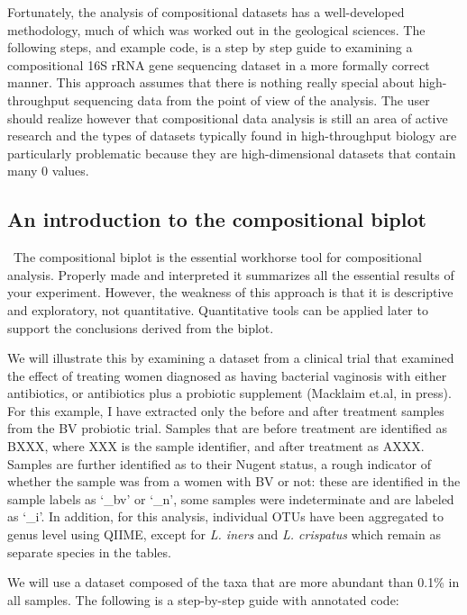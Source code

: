 \documentclass[11pt]{article}\usepackage[]{graphicx}\usepackage[]{color}
\begin{document}
Fortunately, the analysis of compositional datasets has a well-developed methodology, much of which was worked out in the geological sciences. The following steps, and example code, is a step by step guide to examining a compositional 16S rRNA gene sequencing dataset in a more formally correct manner. This approach assumes that there is nothing really special about high-throughput sequencing data from the point of view of the analysis. The user should realize however that compositional data analysis is still an area of active research and the types of datasets typically found in high-throughput biology are particularly problematic because they are  high-dimensional datasets that contain many 0 values.

\subsection{An introduction to the compositional biplot}\  The compositional biplot is the essential workhorse tool for compositional analysis. Properly made and interpreted it summarizes all the essential results of your experiment. However, the weakness of this approach is that it is descriptive and exploratory, not quantitative. Quantitative tools can be applied later to support the conclusions derived from the biplot. 

We will illustrate this by examining a dataset from a clinical trial that examined the effect of treating women diagnosed as having bacterial vaginosis with either antibiotics, or antibiotics plus a probiotic supplement (Macklaim et.al, in press). For this example, I have extracted only the before and after treatment samples from the BV probiotic trial. Samples that are before treatment are identified as BXXX, where XXX is the sample identifier, and after treatment as AXXX. Samples are further identified as to their Nugent status, a rough indicator of whether the sample was from a women with BV or not: these are identified in the sample labels as `\_bv' or `\_n', some samples were indeterminate and are labeled as `\_i'. In addition, for this analysis,  individual OTUs have been aggregated to genus level using QIIME, except for \emph{L. iners} and \emph{L. crispatus} which remain as separate species in the tables.

We will use a dataset composed of the taxa that are more abundant than 0.1\% in all samples. The following is a step-by-step guide with annotated code:
\end{document}
